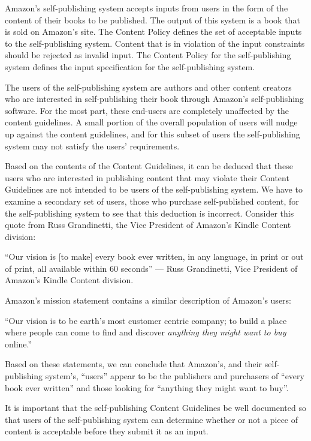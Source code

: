 \documentclass[11pt]{article}
\begin{document}
\begin{multicols}{2}
Amazon's self-publishing system accepts inputs from users in the form of the content of their books to be published.  The output of this system is a book that is sold on Amazon's site.  The Content Policy defines the set of acceptable inputs to the self-publishing system.  Content that is in violation of the input constraints should be rejected as invalid input.  The Content Policy for the self-publishing system defines the input specification for the self-publishing system. 

The users of the self-publishing system are authors and other content creators who are interested in self-publishing their book through Amazon's self-publishing software.  For the most part, these end-users are completely unaffected by the content guidelines.  A small portion of the overall population of users will nudge up against the content guidelines, and for this subset of users the self-publishing system may not satisfy the users' requirements.

Based on the contents of the Content Guidelines, it can be deduced that these users who are interested in publishing content that may violate their Content Guidelines are not intended to be users of the self-publishing system.  We have to examine a secondary set of users, those who purchase self-published content, for the self-publishing system to see that this deduction is incorrect.  Consider this quote from Russ Grandinetti, the Vice President of Amazon's Kindle Content division:

``Our vision is [to make] every book ever written, in any language, in print or out of print, all available within 60 seconds'' --- Russ Grandinetti, Vice President of Amazon's Kindle Content division. \cite{LATimesRussQuote}

Amazon's mission statement contains a similar description of Amazon's users:

``Our vision is to be earth's most customer centric company; to build a place where people can come to find and discover \emph{anything they might want to buy} online.'' \cite[Emphasis Mine]{AmazonIRFAQ}

Based on these statements, we can conclude that Amazon's, and their self-publishing system's, ``users'' appear to be the publishers and purchasers of ``every book ever written'' and those looking for ``anything they might want to buy''.

It is important that the self-publishing Content Guidelines be well documented so that users of the self-publishing system can determine whether or not a piece of content is acceptable before they submit it as an input.


\end{multicols}
\end{document}
